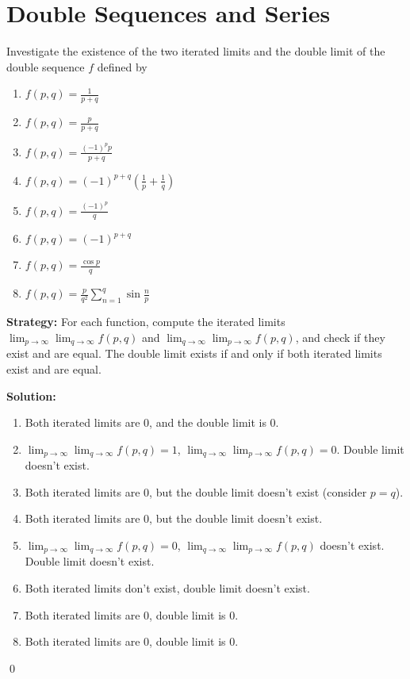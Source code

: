 \section{Double Sequences and Series}



\begin{problembox}
Investigate the existence of the two iterated limits and the double limit of the double sequence \(f\) defined by
\begin{enumerate}[label=\alph*)]
\item \( f(p, q) = \frac{1}{p + q}\)
\item \( f(p, q) = \frac{p}{p + q}\)
\item \( f(p, q) = \frac{(-1)^p p}{p + q}\)
\item \( f(p, q) = (-1)^{p+q} \left( \frac{1}{p} + \frac{1}{q} \right)\)
\item \( f(p, q) = \frac{(-1)^p}{q}\)
\item \( f(p, q) = (-1)^{p+q}\)
\item \( f(p, q) = \frac{\cos p}{q}\)
\item \( f(p, q) = \frac{p}{q^2} \sum_{n=1}^{q} \sin \frac{n}{p}\)
\end{enumerate}
\end{problembox}

\noindent\textbf{Strategy:} For each function, compute the iterated limits \(\lim_{p \to \infty} \lim_{q \to \infty} f(p,q)\) and \(\lim_{q \to \infty} \lim_{p \to \infty} f(p,q)\), and check if they exist and are equal. The double limit exists if and only if both iterated limits exist and are equal.

\bigskip\noindent\textbf{Solution:}
\begin{enumerate}[label=(\alph*)]
\item Both iterated limits are 0, and the double limit is 0.
\item \(\lim_{p \to \infty} \lim_{q \to \infty} f(p,q) = 1\), \(\lim_{q \to \infty} \lim_{p \to \infty} f(p,q) = 0\). Double limit doesn't exist.
\item Both iterated limits are 0, but the double limit doesn't exist (consider \(p = q\)).
\item Both iterated limits are 0, but the double limit doesn't exist.
\item \(\lim_{p \to \infty} \lim_{q \to \infty} f(p,q) = 0\), \(\lim_{q \to \infty} \lim_{p \to \infty} f(p,q)\) doesn't exist. Double limit doesn't exist.
\item Both iterated limits don't exist, double limit doesn't exist.
\item Both iterated limits are 0, double limit is 0.
\item Both iterated limits are 0, double limit is 0.
\end{enumerate}\qed



